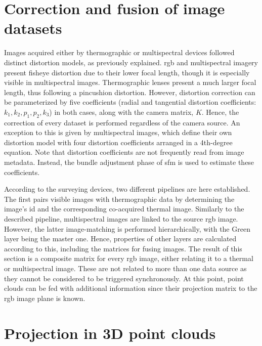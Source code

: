 \section{Correction and fusion of image datasets}

Images acquired either by thermographic or multispectral devices followed distinct distortion models, as previously explained. \acrshort{rgb} and multispectral imagery present fisheye distortion due to their lower focal length, though it is especially visible in multispectral images. Thermographic lenses present a much larger focal length, thus following a pincushion distortion. However, distortion correction can be parameterized by five coefficients (radial and tangential distortion coefficients: $k_1, k_2, p_1, p_2, k_3$) in both cases, along with the camera matrix, $K$. Hence, the correction of every dataset is performed regardless of the camera source. An exception to this is given by multispectral images, which define their own distortion model with four distortion coefficients arranged in a 4th-degree equation. Note that distortion coefficients are not frequently read from image metadata. Instead, the bundle adjustment phase of \acrshort{sfm} is used to estimate these coefficients. 

According to the surveying devices, two different pipelines are here established. The first pairs visible images with thermographic data by determining the image's id and the corresponding co-acquired thermal image. Similarly to the described pipeline, multispectral images are linked to the source \acrshort{rgb} image. However, the latter image-matching is performed hierarchically, with the Green layer being the master one. Hence, properties of other layers are calculated according to this, including the matrices for fusing images. The result of this section is a composite matrix for every \acrshort{rgb} image, either relating it to a thermal or multispectral image. These are not related to more than one data source as they cannot be considered to be triggered synchronously. At this point, point clouds can be fed with additional information since their projection matrix to the \acrshort{rgb} image plane is known. 

\section{Projection in 3D point clouds}

